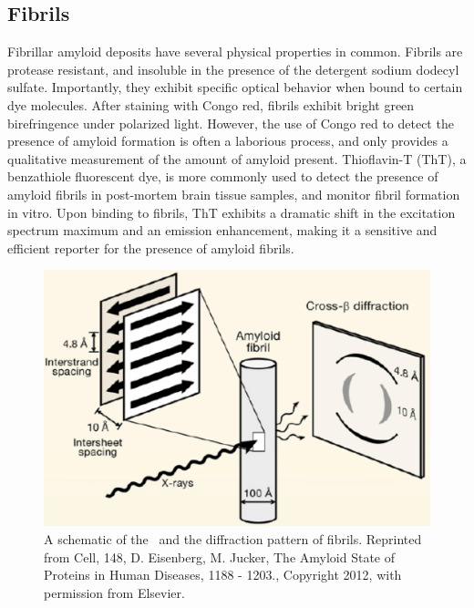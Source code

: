 
\subsection{Fibrils}

Fibrillar amyloid deposits have several physical properties in common. Fibrils are protease resistant, and insoluble in the presence of the detergent sodium dodecyl sulfate.\cite{Eisenberg:2012hm} Importantly, they exhibit specific optical behavior when bound to certain dye molecules. After staining with Congo red, fibrils exhibit bright green birefringence under polarized light.\cite{Frid:2007bo} However, the use of Congo red to detect the presence of amyloid formation is often a laborious process, and only provides a qualitative measurement of the amount of amyloid present.\cite{Frid:2007bo} Thioflavin-T (ThT), a benzathiole fluorescent dye, is more commonly used to detect the presence of amyloid fibrils in post-mortem brain tissue samples, and monitor fibril formation in vitro. Upon binding to fibrils, ThT exhibits a dramatic shift in the excitation spectrum maximum and an emission enhancement, making it a sensitive and efficient reporter for the presence of amyloid fibrils.\cite{Nilsson:2004iw}

\begin{figure}
 \centering
 \includegraphics[width=5in]{figures/introduction/fibril_structure_diffraction.pdf}
 \caption[Characteristic cross-$\beta$ spacings from X-ray fibre diffraction studies of amyloid fibrils]{A schematic of the \crossbs\ and the diffraction pattern of fibrils. Reprinted from Cell, 148, D. Eisenberg, M. Jucker, The Amyloid State of Proteins in Human Diseases, 1188 - 1203.,  Copyright 2012, with permission from Elsevier.}
 \label{fig:fibril_diffraction}
\end{figure}

